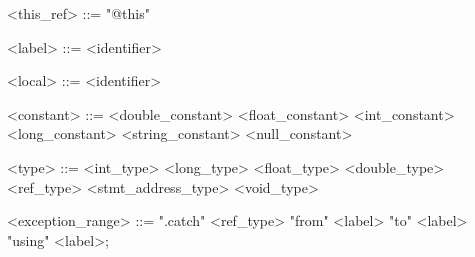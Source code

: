 \documentclass{report}
\begin{document}
\begin{grammar}
<this_ref> ::= "@this"

<label> ::= <identifier>

<local> ::= <identifier>

<constant> ::= <double_constant> \alt <float_constant> \alt <int_constant> \alt <long_constant>  <string_constant> \alt <null_constant>

<type> ::= <int_type> \alt <long_type> \alt <float_type> \alt <double_type> \alt <ref_type> <stmt_address_type> \alt <void_type>

<exception_range> ::= ".catch" <ref_type> "from" <label> "to" <label> "using" <label>;

\end{grammar}
\end{document}
